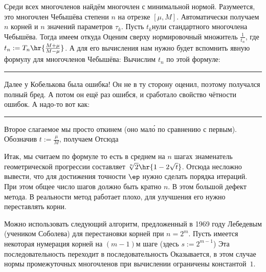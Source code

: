 \documentclass[a4paper]{article}
\newenvironment{petit}{\medskip\hrule\smallskip\footnotesize}{\par\smallskip\hrule\medskip}
\begin{document}
Среди всех многочленов найдём многочлен с минимальной нормой. Разумеется, это многочлен Чебышёва степени $n$
на отрезке $[\mu,M]$.
Автоматически получаем $n$ корней и $n$ значений параметров $\tau_k$. Пусть $t_k$\т нули стандартного многочлена Чебышёва.
Тогда имеем
откуда
Оценим сверху нормировочный множитель $\frac{1}{t_n}$, где $t_n := T_n\hr{\frac{M + \mu}{M - \mu}}$.
А для его вычисления нам нужно будет вспомнить явную формулу для многочленов Чебышёва:
Вычислим $t_n$ по этой формуле:
\begin{petit}
Далее у Кобелькова была ошибка! Он не в ту сторону оценил, поэтому получался полный бред.
А потом он ещё раз ошибся, и сработало свойство чётности ошибок.
А надо-то вот как:
\end{petit}
Второе слагаемое мы просто откинем (оно мал\'о по сравнению с первым).
Обозначив $t := \frac{\mu}{M}$, получаем
Отсюда

Итак, мы считаем по формуле
то есть в среднем на $n$ шагах знаменатель геометрической
прогрессии составляет $\sqrt[n]{2}\hr{1-2\sqrt t}$.
Отсюда несложно вывести, что для достижения точности $\ep$ нужно сделать порядка
итераций. При этом общее число шагов должно  быть
кратно $n$. В этом большой дефект метода. В реальности метод работает плохо, для улучшения его нужно переставлять корни.

Можно использовать  следующий алгоритм, предложенный в 1969 году Лебедевым (учеником Соболева) для перестановки корней при $n= 2^m$.
Пусть имеется некоторая нумерация корней на $(m-1)$\д м шаге (здесь $s := 2^{m-1}$)
Эта последовательность переходит в последовательность
Оказывается, в этом случае нормы промежуточных многочленов при вычислении ограничены константой~$1$.
\end{document}
